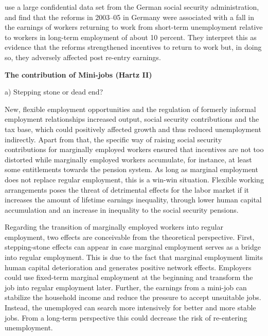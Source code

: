 \documentclass[12pt, a4paper]{article}
\begin{document}
\cite{EngbomDetragiacheRaei15} use a large confidential data set from the
German social security administration, and find that the reforms in 2003–05 in Germany were associated with a fall in the earnings of workers returning to work from short-term unemployment relative to workers in long-term employment of about 10 percent. They interpret this as evidence that the reforms strengthened incentives to return to work but, in doing so, they adversely affected post re-entry earnings.


\textbf{The contribution of Mini-jobs (Hartz II)}

a) Stepping stone or dead end?

New, flexible employment opportunities and the regulation of formerly informal employment relationships increased output, social security contributions and the tax base, which could positively affected growth and thus reduced unemployment indirectly. Apart from that, the specific way of raising social security contributions for marginally employed workers ensured that incentives are not too distorted while marginally employed workers accumulate, for instance, at least some entitlements towards the pension system. As long as marginal employment does not replace regular employment, this is a win-win situation. Flexible working arrangements poses the threat of detrimental effects for the labor market if it increases the amount of lifetime earnings inequality, through lower human capital accumulation and an increase in inequality to the social security pensions.

Regarding the transition of marginally employed workers into regular employment, two effects are conceivable from the theoretical perspective. First, stepping-stone effects can appear in case marginal employment serves as a bridge into regular employment. This is due to the fact that marginal employment limits human capital deterioration and generates positive network effects. Employers could use fixed-term marginal employment at the beginning and transform the job into regular employment later. Further, the earnings from a mini-job can stabilize the household income and reduce the pressure to accept unsuitable jobs. Instead, the unemployed can search more intensively for better and more stable jobs. From a long-term perspective this could decrease the risk of re-entering unemployment.
\end{document}
